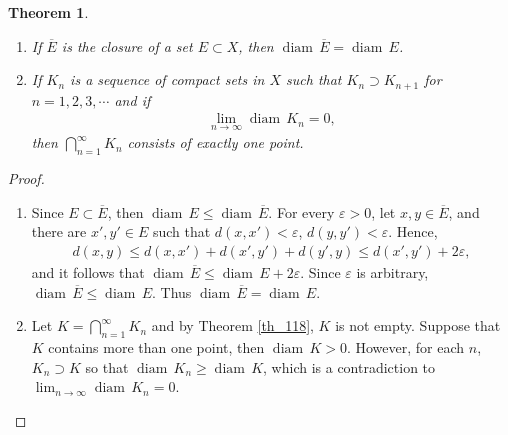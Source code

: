 \documentclass[11pt]{book}
\newtheorem{theorem}{Theorem}[chapter]
\theoremstyle{definition}
\numberwithin{equation}{chapter}
\def\diam{{\operatorname{diam}\,}}
\begin{document}
\medskip

\begin{theorem}\label{th_213}
~\begin{enumerate}[label=(\alph*)]
    \item If $\overline{E}$ is the closure of a set $E \subset X$, then $\diam \overline{E} = \diam E$. \label{th_213_a}
    
    \item If $K_n$ is a sequence of compact sets in $X$ such that $K_n \supset K_{n+1}$ for $n = 1,2,3,\cdots$ and if
    \begin{align*}
        \lim_{n\to\infty} \diam K_n = 0,
    \end{align*}
    then $\bigcap^\infty_{n=1} K_n$ consists of exactly one point. \label{th_213_b}
\end{enumerate}
\end{theorem}
\begin{proof}
~\begin{enumerate}[label=(\alph*)]
    \item Since $E \subset \overline{E}$, then $\diam E \leq \diam \overline{E}$. For every $\varepsilon > 0$, let $x,y \in \overline{E}$, and there are $x',y' \in E$ such that $d(x,x') < \varepsilon$, $d(y,y') < \varepsilon$. Hence, 
    \begin{align*}
        d(x,y) \leq d(x,x') + d(x',y') + d(y',y) \leq d(x',y') + 2 \varepsilon,
    \end{align*}
    and it follows that $\diam \overline{E} \leq \diam E + 2 \varepsilon$. Since $\varepsilon$ is arbitrary, $\diam \overline{E} \leq \diam E$. Thus $\diam \overline{E} = \diam E$.
    
    \item Let $K = \bigcap^\infty_{n=1} K_n$ and by Theorem \ref{th_118}, $K$ is not empty. Suppose that $K$ contains more than one point, then $\diam K > 0$. However, for each $n$, $K_n \supset K$ so that $\diam K_n \geq \diam K$, which is a contradiction to $\lim_{n\to\infty} \diam K_n = 0$. 
\end{enumerate}
\end{proof}

\medskip
\end{document}
